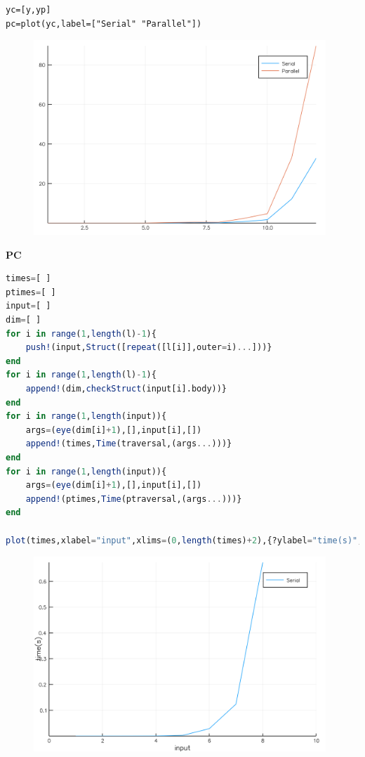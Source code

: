 \documentclass[a4paper,12pt]{article}
\begin{document}
\begin{verbatim}
yc=[y,yp]
pc=plot(yc,label=["Serial" "Parallel"])
\end{verbatim}
\begin{figure}[ht!]
\centering
\includegraphics[width=11cm,scale=0.5]{comptraversal.png}
\end{figure}
\newpage
\textbf{PC}
\begin{lstlisting}[language=Julia,format=Julia]
times=[ ]
ptimes=[ ]
input=[ ]
dim=[ ]
for i in range(1,length(l)-1){
	push!(input,Struct([repeat([l[i]],outer=i)...]))}
end
for i in range(1,length(l)-1){
	append!(dim,checkStruct(input[i].body))}
end
for i in range(1,length(input)){
	args=(eye(dim[i]+1),[],input[i],[])
	append!(times,Time(traversal,(args...)))}
end
for i in range(1,length(input)){
	args=(eye(dim[i]+1),[],input[i],[])
	append!(ptimes,Time(ptraversal,(args...)))}
end

plot(times,xlabel="input",xlims=(0,length(times)+2),{?ylabel="time(s)",label=["Serial"])
\end{lstlisting}
\begin{figure}[ht!]
\centering
\includegraphics[width=11cm,scale=0.5]{traversalSerial.png}
\end{figure}
\end{document}
